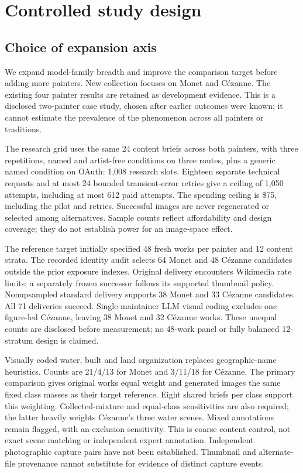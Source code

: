 \documentclass[11pt]{article}
\begin{document}
\section{Controlled study design}
\subsection{Choice of expansion axis}
We expand model-family breadth and improve the comparison target before adding
more painters. New collection focuses on Monet and Cézanne. The existing four
painter results are retained as development evidence. This is a disclosed
two-painter case study, chosen after earlier outcomes were known; it cannot
estimate the prevalence of the phenomenon across all painters or traditions.

The research grid uses the same 24 content briefs across both painters, with three
repetitions, named and artist-free conditions on three routes, plus a generic
named condition on OAuth: 1,008 research slots. Eighteen separate technical
requests and at most 24 bounded transient-error retries give a ceiling of 1,050
attempts, including at most 612 paid attempts. The spending ceiling is \$75,
including the pilot and retries. Successful images are never regenerated or
selected among alternatives. Sample counts reflect affordability and design
coverage; they do not establish power for an image-space effect.

The reference target initially specified 48 fresh works per painter and 12
content strata. The recorded identity audit selects 64 Monet and 48 Cézanne
candidates outside the prior exposure indexes. Original delivery encounters
Wikimedia rate limits; a separately frozen successor follows its supported
thumbnail policy. Nonupsampled standard delivery supports 38 Monet and 33
Cézanne candidates. All 71 deliveries succeed. Single-maintainer LLM visual
coding excludes one figure-led Cézanne, leaving 38 Monet and 32 Cézanne works.
These unequal counts are disclosed before measurement; no 48-work panel or
fully balanced 12-stratum design is claimed.

Visually coded water, built and land organization replaces geographic-name
heuristics. Counts are 21/4/13 for Monet and 3/11/18 for Cézanne. The primary
comparison gives original works equal weight and generated images the same fixed
class masses as their target reference. Eight shared briefs per class support this
weighting. Collected-mixture and equal-class sensitivities are also required;
the latter heavily weights Cézanne's three water scenes. Mixed annotations remain
flagged, with an exclusion sensitivity. This is coarse content control, not exact
scene matching or independent expert annotation. Independent photographic
capture pairs have not been established. Thumbnail and alternate-file provenance
cannot substitute for evidence of distinct capture events.
\end{document}
